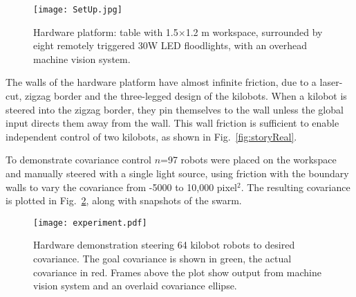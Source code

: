 \begin{figure}
\begin{center}
	\texttt{[image: SetUp.jpg]}
\end{center}
\vspace{-1em}
\caption{\label{fig:setup}
Hardware platform:  table with 1.5$\times$1.2 m workspace, surrounded by eight remotely triggered 30W LED floodlights, with an overhead machine vision system.
}
\vspace{-1em}
\end{figure}

The walls of the hardware platform have almost infinite friction, due to a laser-cut, zigzag border and the three-legged design of the kilobots. When a kilobot is steered into the zigzag border, they pin themselves to the wall unless the global input directs them away from the wall.  This wall friction is sufficient to enable independent control of two kilobots, as shown in Fig.~\ref{fig:storyReal}.





To demonstrate covariance control $n$=97 robots were placed on the workspace and manually steered with a single light source, using friction with the boundary walls to vary the covariance from  -5000 to 10,000 pixel$^2$.  The resulting covariance is plotted in Fig.~\ref{fig:covExperiment}, along with snapshots of the swarm.




\begin{figure}
\begin{center}
	\texttt{[image: experiment.pdf]}
\end{center}
\vspace{-1em}
\caption{\label{fig:covExperiment}
Hardware demonstration steering 64 kilobot robots to desired covariance. The goal covariance is shown in green, the actual covariance in red. Frames above the plot show output from machine vision system and an overlaid covariance ellipse.
\vspace{-1em}
}
\end{figure}

